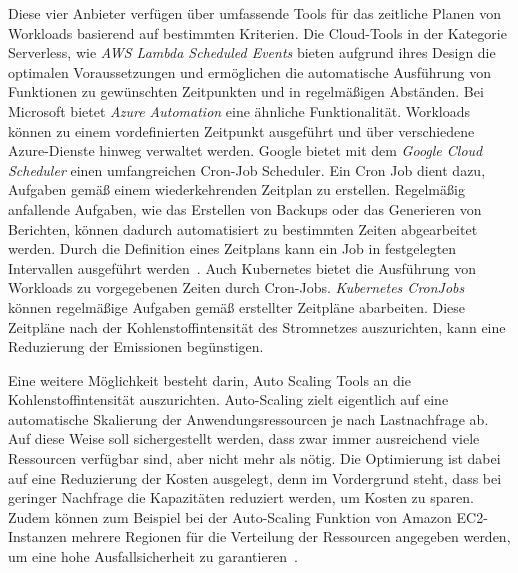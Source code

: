 Diese vier Anbieter verfügen über umfassende Tools für das zeitliche Planen von Workloads basierend auf bestimmten Kriterien.
Die Cloud-Tools in der Kategorie \glqq Serverless\grqq{}, wie \textit{\ac{AWS} Lambda Scheduled Events} bieten aufgrund ihres Design die optimalen Voraussetzungen und ermöglichen die automatische Ausführung von Funktionen zu gewünschten Zeitpunkten und in regelmäßigen Abständen.
Bei Microsoft bietet \textit{Azure Automation} eine ähnliche Funktionalität.
Workloads können zu einem vordefinierten Zeitpunkt ausgeführt und über verschiedene Azure-Dienste hinweg verwaltet werden.
Google bietet mit dem \textit{Google Cloud Scheduler} einen umfangreichen Cron-Job Scheduler.
Ein Cron Job dient dazu, Aufgaben gemäß einem wiederkehrenden Zeitplan zu erstellen.
Regelmäßig anfallende Aufgaben, wie das Erstellen von Backups oder das Generieren von Berichten, können dadurch automatisiert zu bestimmten Zeiten abgearbeitet werden.
Durch die Definition eines Zeitplans kann ein Job in festgelegten Intervallen ausgeführt werden~\cite{TheKubernetesAuthors.20240119T14:53:20+01:00}.
Auch Kubernetes bietet die Ausführung von Workloads zu vorgegebenen Zeiten durch Cron-Jobs.
\textit{Kubernetes CronJobs} können regelmäßige Aufgaben gemäß erstellter Zeitpläne abarbeiten.
Diese Zeitpläne nach der Kohlenstoffintensität des Stromnetzes auszurichten, kann eine Reduzierung der Emissionen begünstigen.


Eine weitere Möglichkeit besteht darin, Auto Scaling Tools an die Kohlenstoffintensität auszurichten.
Auto-Scaling zielt eigentlich auf eine automatische Skalierung der Anwendungsressourcen je nach Lastnachfrage ab.
Auf diese Weise soll sichergestellt werden, dass zwar immer ausreichend viele Ressourcen verfügbar sind, aber nicht mehr als nötig.
Die Optimierung ist dabei auf eine Reduzierung der Kosten ausgelegt, denn im Vordergrund steht, dass bei geringer Nachfrage die Kapazitäten reduziert werden, um Kosten zu sparen.
Zudem können zum Beispiel bei der Auto-Scaling Funktion von Amazon EC2-Instanzen mehrere Regionen für die Verteilung der Ressourcen angegeben werden, um eine hohe Ausfallsicherheit zu garantieren~\cite{AmazonWebServices.20240229}.

